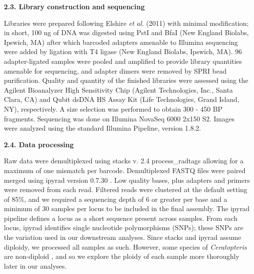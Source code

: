 \documentclass[12pt]{article}
\begin{document}
\begin{flushleft}
\textbf{2.3. Library construction and sequencing}

Libraries were prepared following Elshire \textit{et al.} (2011)\nocite{Elshire2011} with minimal modification; in short, 100 ng of DNA was digested using PstI and BfaI (New England Biolabs, Ipswich, MA) after which barcoded adapters amenable to Illumina sequencing were added by ligation with T4 ligase (New England Biolabs, Ipswich, MA). 96 adapter-ligated samples were pooled and amplified to provide library quantities amenable for sequencing, and adapter dimers were removed by SPRI bead purification. Quality and quantity of the finished libraries were assessed using the Agilent Bioanalyzer High Sensitivity Chip (Agilent Technologies, Inc., Santa Clara, CA) and Qubit\textsuperscript{\textregistered} dsDNA HS Assay Kit (Life Technologies, Grand Island, NY), respectively. A size selection was performed to obtain 300 - 450 BP fragments. Sequencing was done on Illumina NovaSeq 6000 2x150 S2. Images were analyzed using the standard Illumina Pipeline, version 1.8.2. 

\textbf{2.4. Data processing}

Raw data were demultiplexed using stacks v. 2.4 \autocite{Catchen2011, Catchen2013} process\_radtags allowing for a maximum of one mismatch per barcode. Demultiplexed FASTQ files were paired merged using ipyrad version 0.7.30 \autocite{Eaton2020}. Low quality bases, plus adapters and primers were removed from each read. Filtered reads were clustered at the default setting of 85\%, and we required a sequencing depth of 6 or greater per base and a minimum of 30 samples per locus to be included in the final assembly. The ipyrad pipeline defines a locus as a short sequence present across samples. From each locus, ipyrad identifies single nucleotide polymorphisms (SNPs); these SNPs are the variation used in our downstream analyses. Since stacks and ipyrad assume diploidy, we processed all samples as such. However, some species of \textit{Ceratopteris} are non-diploid \autocite{Adjie2007, Masuyama2010}, and so we explore the ploidy of each sample more thoroughly later in our analyses.


\end{flushleft}
\end{document}
